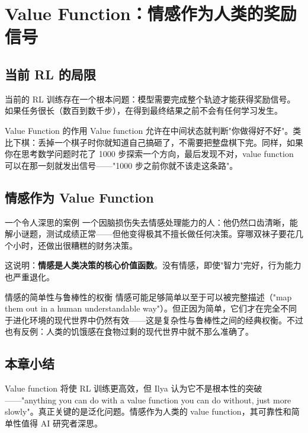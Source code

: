 \section{Value Function：情感作为人类的奖励信号}

\subsection{当前 RL 的局限}

当前的 RL 训练存在一个根本问题：模型需要完成整个轨迹才能获得奖励信号。如果任务很长（数百到数千步），在得到最终结果之前不会有任何学习发生。

\begin{importantbox}{Value Function 的作用}
Value function 允许在中间状态就判断"你做得好不好"。类比下棋：丢掉一个棋子时你就知道自己搞砸了，不需要把整盘棋下完。同样，如果你在思考数学问题时花了 1000 步探索一个方向，最后发现不对，value function 可以在那一刻就发出信号——"1000 步之前你就不该走这条路"。
\end{importantbox}

\subsection{情感作为 Value Function}

\begin{importantbox}{一个令人深思的案例}
一个因脑损伤失去情感处理能力的人：他仍然口齿清晰，能解小谜题，测试成绩正常——但他变得极其不擅长做任何决策。穿哪双袜子要花几个小时，还做出很糟糕的财务决策。

这说明：\textbf{情感是人类决策的核心价值函数}。没有情感，即使"智力"完好，行为能力也严重退化。
\end{importantbox}

\begin{knowledgebox}{情感的简单性与鲁棒性的权衡}
情感可能足够简单以至于可以被完整描述（"map them out in a human understandable way"）。但正因为简单，它们才在完全不同于进化环境的现代世界中仍然有效——这是复杂性与鲁棒性之间的经典权衡。不过也有反例：人类的饥饿感在食物过剩的现代世界中就不那么准确了。
\end{knowledgebox}

\subsection{本章小结}

Value function 将使 RL 训练更高效，但 Ilya 认为它不是根本性的突破——"anything you can do with a value function you can do without, just more slowly"。真正关键的是泛化问题。情感作为人类的 value function，其可靠性和简单性值得 AI 研究者深思。


